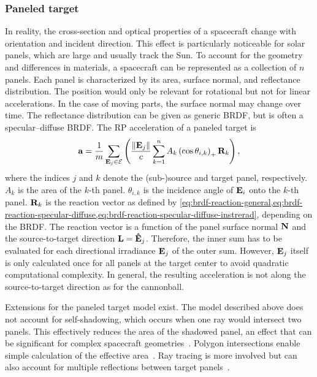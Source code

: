 \subsubsection{Paneled target}
In reality, the cross-section and optical properties of a spacecraft change with orientation and incident direction. This effect is particularly noticeable for solar panels, which are large and usually track the Sun. To account for the geometry and differences in materials, a spacecraft can be represented as a collection of $n$ panels. Each panel is characterized by its area, surface normal, and reflectance distribution. The position would only be relevant for rotational but not for linear accelerations. In the case of moving parts, the surface normal may change over time. The reflectance distribution can be given as generic \gls{BRDF}, but is often a specular--diffuse \gls{BRDF}. The \gls{RP} acceleration of a paneled target is~\cite{Marshall1992}
\begin{align}
    \label{eq:paneled-target}
    \vb a = \frac{1}{m} \sum_{\vb E_j \in \mathcal{E}} \left( \frac{\norm{\vb E_j}}{c} \sum_{k=1}^n A_k \left(\cos\theta_{i,k}\right)_+ \vb R_k\right),
\end{align}
where the indices $j$ and $k$ denote the (sub-)source and target panel, respectively. $A_k$ is the area of the $k$-th panel. $\theta_{i,k}$ is the incidence angle of $\vb E_i$ onto the $k$-th panel. $\vb R_k$ is the reaction vector as defined by {\renewcommand\creflastconjunction{ or }\cref{eq:brdf-reaction-general,eq:brdf-reaction-specular-diffuse,eq:brdf-reaction-specular-diffuse-instrerad}}, depending on the \gls{BRDF}. The reaction vector is a function of the panel surface normal $\vb N$ and the source-to-target direction $\vb L = \vu E_j$. Therefore, the inner sum has to be evaluated for each directional irradiance $\vb E_j$ of the outer sum. However, $\vb E_j$ itself is only calculated once for all panels at the target center to avoid quadratic computational complexity. In general, the resulting acceleration is not along the source-to-target direction as for the cannonball.

Extensions for the paneled target model exist. The model described above does not account for self-shadowing, which occurs when one ray would intersect two panels. This effectively reduces the area of the shadowed panel, an effect that can be significant for complex spacecraft geometries~\cite{Mazarico2009}. Polygon intersections enable simple calculation of the effective area~\cite{Mazarico2009}. Ray tracing is more involved but can also account for multiple reflections between target panels~\cite{Kenneally2020}.

